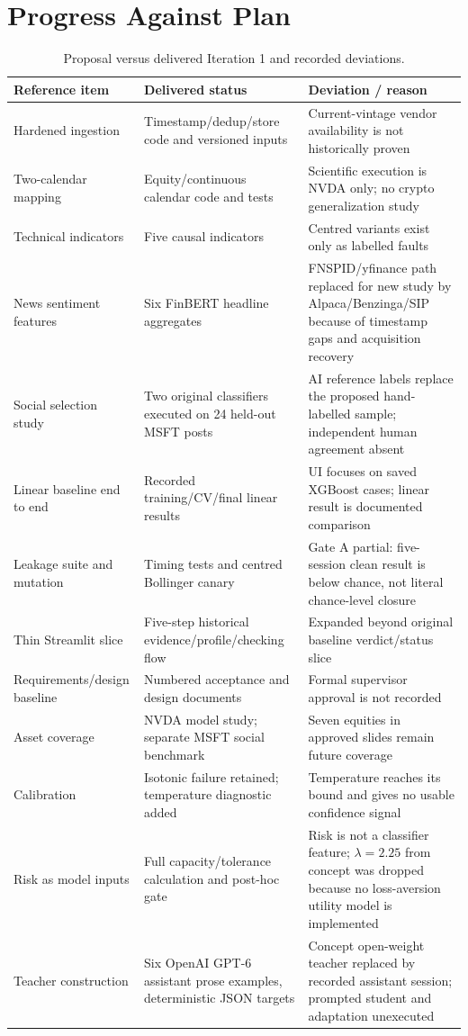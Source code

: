 \section{Progress Against Plan}
\begingroup\small
\begin{longtable}{p{}p{}p{}}
\caption{Proposal versus delivered Iteration 1 and recorded deviations.}\label{tab:proposal-delivered}\\\toprule Reference item & Delivered status & Deviation / reason\\\midrule
Hardened ingestion & Timestamp/dedup/store code and versioned inputs & Current-vintage vendor availability is not historically proven\\
Two-calendar mapping & Equity/continuous calendar code and tests & Scientific execution is NVDA only; no crypto generalization study\\
Technical indicators & Five causal indicators & Centred variants exist only as labelled faults\\
News sentiment features & Six FinBERT headline aggregates & FNSPID/yfinance path replaced for new study by Alpaca/Benzinga/SIP because of timestamp gaps and acquisition recovery\\
Social selection study & Two original classifiers executed on 24 held-out MSFT posts & AI reference labels replace the proposed hand-labelled sample; independent human agreement absent\\
Linear baseline end to end & Recorded training/CV/final linear results & UI focuses on saved XGBoost cases; linear result is documented comparison\\
Leakage suite and mutation & Timing tests and centred Bollinger canary & Gate A partial: five-session clean result is below chance, not literal chance-level closure\\
Thin Streamlit slice & Five-step historical evidence/profile/checking flow & Expanded beyond original baseline verdict/status slice\\
Requirements/design baseline & Numbered acceptance and design documents & Formal supervisor approval is not recorded\\
Asset coverage & NVDA model study; separate MSFT social benchmark & Seven equities in approved slides remain future coverage\\
Calibration & Isotonic failure retained; temperature diagnostic added & Temperature reaches its bound and gives no usable confidence signal\\
Risk as model inputs & Full capacity/tolerance calculation and post-hoc gate & Risk is not a classifier feature; $\lambda=2.25$ from concept was dropped because no loss-aversion utility model is implemented\\
Teacher construction & Six OpenAI GPT-6 assistant prose examples, deterministic JSON targets & Concept open-weight teacher replaced by recorded assistant session; prompted student and adaptation unexecuted\\
\bottomrule\end{longtable}\endgroup
